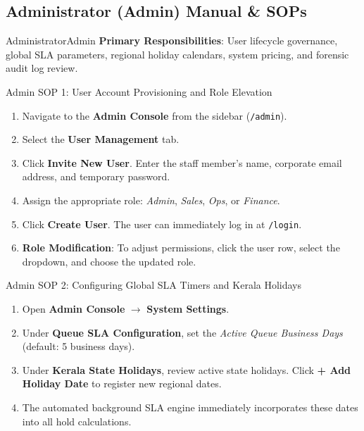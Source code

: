 \documentclass[11pt,a4paper]{article}
\begin{document}
\subsection{Administrator (Admin) Manual \& SOPs}

\begin{rolebox}{Administrator}{Admin}
\textbf{Primary Responsibilities}: User lifecycle governance, global SLA parameters, regional holiday calendars, system pricing, and forensic audit log review.
\end{rolebox}

\begin{sopbox}{Admin SOP 1: User Account Provisioning and Role Elevation}
\begin{enumerate}[leftmargin=1.2em, itemsep=2pt]
    \item Navigate to the \textbf{Admin Console} from the sidebar (\texttt{/admin}).
    \item Select the \textbf{User Management} tab.
    \item Click \textbf{Invite New User}. Enter the staff member's name, corporate email address, and temporary password.
    \item Assign the appropriate role: \textit{Admin}, \textit{Sales}, \textit{Ops}, or \textit{Finance}.
    \item Click \textbf{Create User}. The user can immediately log in at \texttt{/login}.
    \item \textbf{Role Modification}: To adjust permissions, click the user row, select the dropdown, and choose the updated role.
\end{enumerate}
\end{sopbox}

\begin{sopbox}{Admin SOP 2: Configuring Global SLA Timers and Kerala Holidays}
\begin{enumerate}[leftmargin=1.2em, itemsep=2pt]
    \item Open \textbf{Admin Console} $\rightarrow$ \textbf{System Settings}.
    \item Under \textbf{Queue SLA Configuration}, set the \textit{Active Queue Business Days} (default: 5 business days).
    \item Under \textbf{Kerala State Holidays}, review active state holidays. Click \textbf{+ Add Holiday Date} to register new regional dates.
    \item The automated background SLA engine immediately incorporates these dates into all hold calculations.
\end{enumerate}
\end{sopbox}
\end{document}
